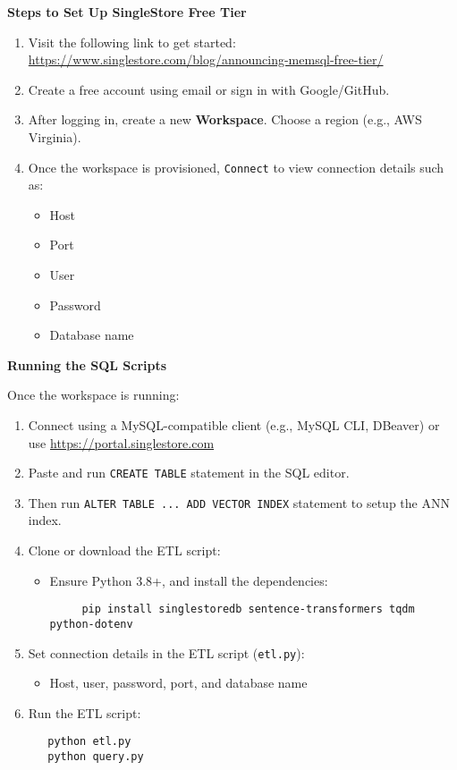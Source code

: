 \documentclass[11pt]{article}
\begin{document}
\textbf{\textbf{Steps to Set Up SingleStore Free Tier}}

\begin{enumerate}
\item Visit the following link to get started:
\url{https://www.singlestore.com/blog/announcing-memsql-free-tier/}

\item Create a free account using email or sign in with Google/GitHub.

\item After logging in, create a new \textbf{Workspace}. Choose a region (e.g., AWS Virginia).

\item Once the workspace is provisioned, \texttt{Connect} to view connection details such as:
\begin{itemize}
\item Host
\item Port
\item User
\item Password
\item Database name
\end{itemize}
\end{enumerate}

\textbf{\textbf{Running the SQL Scripts}}

Once the workspace is running:

\begin{enumerate}
\item Connect using a MySQL-compatible client (e.g., MySQL CLI, DBeaver) or use \url{https://portal.singlestore.com}

\item Paste and run \texttt{CREATE TABLE} statement in the SQL editor.

\item Then run \texttt{ALTER TABLE ...  ADD VECTOR INDEX} statement to setup the ANN index.

\item Clone or download the ETL script:
\begin{itemize}
\item Ensure Python 3.8+, and install the dependencies:
\begin{verbatim}
     pip install singlestoredb sentence-transformers tqdm python-dotenv
\end{verbatim}
\end{itemize}

\item Set connection details in the ETL script (\texttt{etl.py}):
\begin{itemize}
\item Host, user, password, port, and database name
\end{itemize}

\item Run the ETL script:
\begin{verbatim}
   python etl.py
   python query.py
\end{verbatim}
\end{enumerate}
\end{document}
